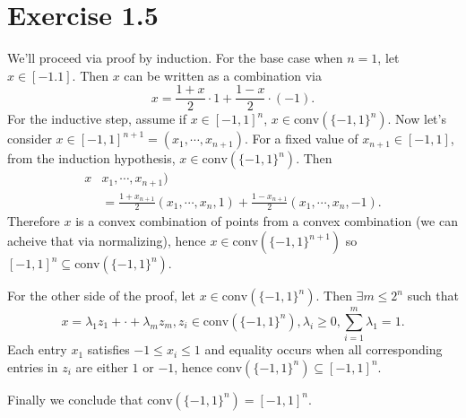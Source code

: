 \newpage
\section*{Exercise 1.5}
We'll proceed via proof by induction. For the base case when $n = 1$, let $x \in [-1. 1]$. Then $x$ can be written 
as a combination via 
\[ x = \frac{1 + x}{2} \cdot 1 + \frac{1 - x}{2} \cdot (-1). \]
For the inductive step, assume if $x \in [-1, 1]^n$, $x \in \text{conv}(\{ -1, 1 \}^n)$. Now let's consider 
$x \in [-1, 1]^{n + 1} = (x_1, \cdots, x_{n + 1})$. For a fixed value of $x_{n + 1} \in [-1, 1]$, from the 
induction hypothesis, $x \in \text{conv}(\{ -1, 1 \}^n)$. Then 
\begin{align*}
	x 
	&x_1, \cdots, x_{n + 1}) \\
	&= \frac{1 + x_{n + 1}}{2}(x_1, \cdots, x_n, 1) + \frac{1 - x_{n + 1}}{2}(x_1, \cdots, x_n, -1).
\end{align*}
Therefore $x$ is a convex combination of points from a convex combination (we can acheive that via normalizing), hence 
$x \in \text{conv}(\{ -1, 1 \}^{n + 1})$ so $[-1,1]^n \subseteq \text{conv}(\{-1, 1\}^n)$.

For the other side of the proof, let $x \in \text{conv}(\{ -1, 1 \}^n)$. Then $\exists m \leq 2^n$ such that 
\[ x = \lambda_1 z_1 + \cdot + \lambda_m z_m, z_i \in \text{conv}(\{ -1, 1 \}^n), \lambda_i \geq 0, 
\sum_{i = 1}^{m} \lambda_1 = 1. \]
Each entry $x_1$ satisfies $-1 \leq x_i \leq 1$ and equality occurs when all corresponding entries in $z_i$ are 
either $1$ or $-1$, hence $\text{conv}(\{-1, 1\}^n) \subseteq [-1, 1]^n$.

Finally we conclude that $\text{conv}(\{-1, 1\}^n) = [-1, 1]^n$.


\newpage
